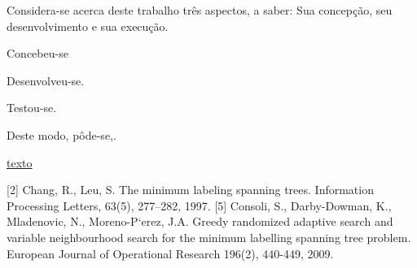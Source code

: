 \documentclass[12pt]{article}
\begin{document}
	Considera-se acerca deste trabalho três aspectos, a saber: Sua concepção, seu desenvolvimento e sua execução.

	Concebeu-se

	Desenvolveu-se.

	Testou-se.

	Deste modo, pôde-se,.




\href{https://www.ime.usp.br/~cris/aulas/12_1_6711/slides/aula13.pdf}{texto}

[2] Chang, R., Leu, S. The minimum labeling spanning trees. Information Processing Letters, 63(5), 277–282, 1997.
[5] Consoli, S., Darby-Dowman, K., Mladenovic, N., Moreno-P`erez, J.A. Greedy randomized adaptive search and variable neighbourhood search for the minimum labelling spanning tree problem. European Journal of Operational Research 196(2), 440-449, 2009.
\end{document}
